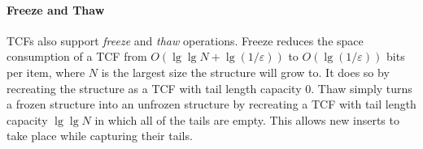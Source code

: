 \documentclass[letterpaper,twocolumn,10pt]{article}
\newcommand{\etal}{et al.}
\begin{document}
\paragraph{Freeze and Thaw}
TCFs also support {\em freeze} and {\em thaw} operations.
Freeze reduces the space consumption of a TCF from $O(\lg \lg N + \lg (1/\varepsilon))$ to $O(\lg (1 / \varepsilon))$ bits per item, where $N$ is the largest size the structure will grow to.
It does so by recreating the structure as a TCF with tail length capacity $0$.
Thaw simply turns a frozen structure into an unfrozen structure by recreating a TCF with tail length capacity $\lg \lg N$ in which all of the tails are empty.
This allows new inserts to take place while capturing their tails.



\end{document}
